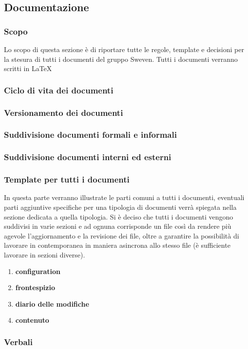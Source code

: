 \subsection{Documentazione}
\subsubsection{Scopo}
Lo scopo di questa sezione è di riportare tutte le regole, template e decisioni 
per la stesura di tutti i documenti del gruppo Sweven. \newline
Tutti i documenti verranno scritti in \LaTeX

\subsubsection{Ciclo di vita dei documenti}

\subsubsection{Versionamento dei documenti}

\subsubsection{Suddivisione documenti formali e informali}

\subsubsection{Suddivisione documenti interni ed esterni}

\subsubsection{Template per tutti i documenti}
In questa parte verranno illustrate le parti comuni a tutti i documenti,
eventuali parti aggiuntive specifiche per una tipologia di documenti
verrà spiegata nella sezione dedicata a quella tipologia. \newline
Si è deciso che tutti i documenti vengono suddivisi in varie sezioni 
e ad ognuna corrisponde un file così da rendere più agevole l'aggiornamento 
e la revisione dei file, oltre a garantire la possibilità di 
lavorare in contemporanea in maniera asincrona allo stesso file 
(è sufficiente lavorare in sezioni diverse).

\begin{enumerate}
    \item \textbf{configuration}

    \item \textbf{frontespizio}
    
    \item \textbf{diario delle modifiche}

    \item \textbf{contenuto}
\end{enumerate}

\subsubsection{Verbali}